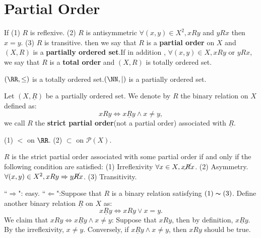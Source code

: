 \section{Partial Order}
\begin{definitionenv}
    If 
    \newline
    (1) $R$ is reflexive.
    \newline
    (2) $R$ is antisymmetric $\forall (x, y)\in X^2, xRy $ and $yRx$ then $x=y$.
    \newline
    (3) $R$ is transitive.
    \newline
    then we say that $R$ is a \textbf{partial order} on $X$ and $(X, R) $ is a \textbf{partially ordered set}.If in addition , $\forall (x, y)\in X , xRy$ or $yRx$,  we say that $R$ is a \textbf{total order} and $(X, R)$ is totally ordered set. 
\end{definitionenv}
\begin{exampleenv}
    $(\RR , \le)$ is a totally ordered set.$(\NN , \mid )$ is a partially ordered set.  
\end{exampleenv}
\begin{definitionenv}
    Let $(X, \underline{R})$ be a partially ordered set. We denote by $R$ the binary relation on $X$ defined as:$$xRy \Leftrightarrow x\underline{R}y \wedge x\not=y, $$ we call $R$ the \textbf{strict partial order}(not a partial order) associated with $\underline{R}$.
\end{definitionenv}
\begin{exampleenv}
    \quad
    \newline
    (1) $<$ on $\RR$.
    \newline
    (2) $\subset$ on $ \mathscr{P} (X)$.
\end{exampleenv}
\begin{propositionenv}
    $R$ is the strict partial order associated with some partial order if and only if the following condition are satisfied:
    \newline
    (1) Irreflexivity $\forall x\in X, x \cancel{R}x$.
    \newline
    (2) Asymmetry.$\forall (x, y)\in X^2, xRy\Rightarrow y\cancel{R}x$.
    \newline
    (3) Transitivity.
\end{propositionenv}
\begin{proofenv}
    ``$\Rightarrow$": easy.
    \newline
    ``$\Leftarrow$":Suppose that $R$ is a binary relation satisfying $(1)\thicksim(3)$. Define another binary relation $\underline{R}$ on $X$ as:
    $$x\underline{R}y\Leftrightarrow xRy \vee x=y.$$
    We claim that $xRy\Leftrightarrow x\underline{R}y \wedge x\not= y$:
    \newline
    Suppose that $xRy$,  then by definition,  $x\underline{R}y$. By the irreflexivity,  $x\not=y$.
    \newline
    Conversely,  if $x\underline{R}y\wedge x\not=y$, then $xRy$ should be true.
\end{proofenv}
